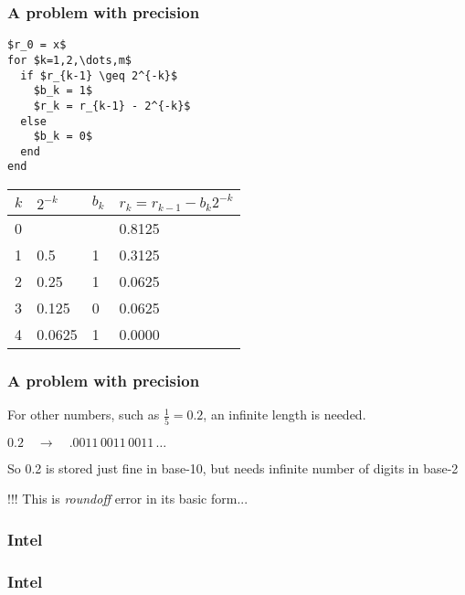 \documentclass[10pt]{beamer}
\begin{document}
\begin{frame}[fragile]
\frametitle{A problem with precision}
\begin{lstlisting}[mathescape]
$r_0 = x$
for $k=1,2,\dots,m$
  if $r_{k-1} \geq 2^{-k}$
    $b_k = 1$
    $r_k = r_{k-1} - 2^{-k}$
  else
    $b_k = 0$
  end 
end
\end{lstlisting}
\begin{tabular}{l | l | l | l}\hline
$k$ & $2^{-k}$ & $b_k$ & $r_k = r_{k-1} - b_{k}2^{-k}$\\\hline
0 & & & 0.8125 \\
1 & 0.5    & 1 & 0.3125 \\
2 & 0.25   & 1 & 0.0625 \\
3 & 0.125  & 0 & 0.0625 \\
4 & 0.0625 & 1 & 0.0000 \\
\end{tabular}
\end{frame}
\begin{frame}
\frametitle{A problem with precision}
For other numbers, such as $\frac{1}{5} = 0.2$, an infinite length
is needed.

\begin{block}{}
$0.2 \quad\rightarrow\quad .0011\, 0011\, 0011\, \dots$

\vspace{0.5cm}
So 0.2 is stored just fine in base-10, but needs infinite number of digits
in base-2
\end{block}

\begin{alertblock}{!!!}
This is \emph{roundoff} error in its basic form...
\end{alertblock}
\end{frame}
\begin{frame}[shrink]
\frametitle{Intel}
\end{frame}
\begin{frame}[shrink]
\frametitle{Intel}
\end{frame}
\end{document}
